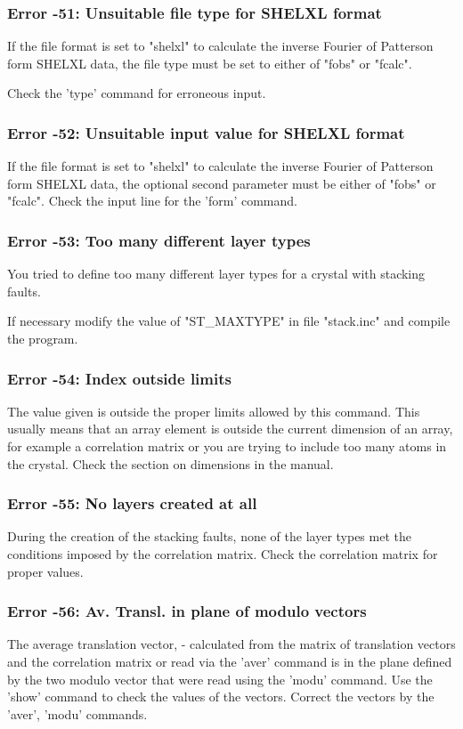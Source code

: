 \subsubsection{Error -51: Unsuitable file type for SHELXL format}
\par
If the file format is set to "shelxl" to calculate the inverse Fourier of 
Patterson form SHELXL data, the file type must be set to either of 
"fobs" or "fcalc". 
\par
Check the 'type' command for erroneous input. 
\subsubsection{Error -52: Unsuitable input value for SHELXL format}
\par
If the file format is set to "shelxl" to calculate the inverse Fourier of 
Patterson form SHELXL data, the optional second parameter must be either of 
"fobs" or "fcalc". 
Check the input line for the 'form' command. 
\subsubsection{Error -53: Too many different layer types}
\par
You tried to define too many different layer types for a crystal with 
stacking faults. 
\par
If necessary modify the value of "ST\_MAXTYPE" in file "stack.inc" 
and compile the program. 
\subsubsection{Error -54: Index outside limits}
\par
The value given is outside the proper limits allowed by this command. 
This usually means that an array element is outside the current 
dimension of an array, for example a correlation matrix or you are 
trying to include too many atoms in the crystal. Check the section 
on dimensions in the manual. 
\subsubsection{Error -55: No layers created at all}
\par
During the creation of the stacking faults, none of the layer types 
met the conditions imposed by the correlation matrix. Check the 
correlation matrix for proper values. 
\subsubsection{Error -56: Av. Transl. in plane of modulo vectors}
\par
The average translation vector, - calculated from the matrix of 
translation vectors and the correlation matrix or read via the 'aver' 
command is in the plane defined by the two modulo vector that were 
read using the 'modu' command. 
Use the 'show' command to check the values of the vectors. Correct 
the vectors by the 'aver', 'modu' commands. 
